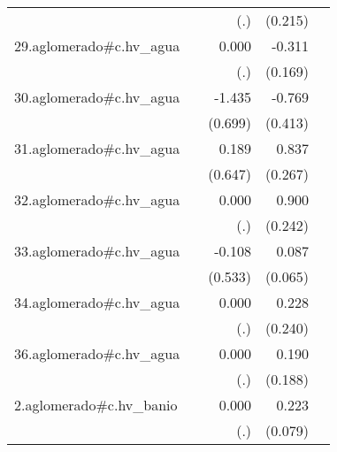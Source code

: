 {\begin{longtable}{l*{4}{D{.}{.}{-1}}}
            &                     &         (.)         &     (0.215)         &                     \\
\addlinespace
29.aglomerado#c.hv\_agua&                     &       0.000         &      -0.311         &                     \\
            &                     &         (.)         &     (0.169)         &                     \\
\addlinespace
30.aglomerado#c.hv\_agua&                     &      -1.435\sym{*}  &      -0.769         &                     \\
            &                     &     (0.699)         &     (0.413)         &                     \\
\addlinespace
31.aglomerado#c.hv\_agua&                     &       0.189         &       0.837\sym{**} &                     \\
            &                     &     (0.647)         &     (0.267)         &                     \\
\addlinespace
32.aglomerado#c.hv\_agua&                     &       0.000         &       0.900\sym{***}&                     \\
            &                     &         (.)         &     (0.242)         &                     \\
\addlinespace
33.aglomerado#c.hv\_agua&                     &      -0.108         &       0.087         &                     \\
            &                     &     (0.533)         &     (0.065)         &                     \\
\addlinespace
34.aglomerado#c.hv\_agua&                     &       0.000         &       0.228         &                     \\
            &                     &         (.)         &     (0.240)         &                     \\
\addlinespace
36.aglomerado#c.hv\_agua&                     &       0.000         &       0.190         &                     \\
            &                     &         (.)         &     (0.188)         &                     \\
\addlinespace
2.aglomerado#c.hv\_banio&                     &       0.000         &       0.223\sym{**} &                     \\
            &                     &         (.)         &     (0.079)         &                     \\

\end{longtable}}
